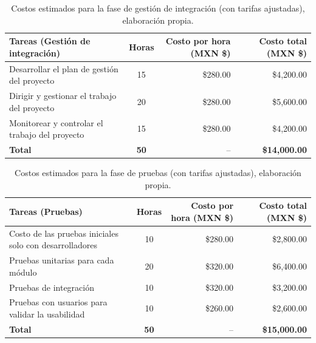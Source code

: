 \begin{table}[H]
	\centering
	\renewcommand{\arraystretch}{1.6}
	\setlength{\tabcolsep}{10pt}
	\Huge
	\begin{adjustbox}{max width=\textwidth}
		\begin{tabular}{|p{9.5cm}|c|r|r|}
			\hline
			\textbf{Tareas (Gestión de integración)} & \textbf{Horas} & \textbf{Costo por hora (MXN \$)} & \textbf{Costo total (MXN \$)} \\ \hline
			Desarrollar el plan de gestión del proyecto & 15 & \$280.00 & \$4,200.00 \\ \hline
			Dirigir y gestionar el trabajo del proyecto & 20 & \$280.00 & \$5,600.00 \\ \hline
			Monitorear y controlar el trabajo del proyecto & 15 & \$280.00 & \$4,200.00 \\ \hline
			\textbf{Total} & \textbf{50} & -- & \textbf{\$14,000.00} \\ \hline
		\end{tabular}
	\end{adjustbox}
	\caption[Costos estimados para la fase de gestión de integración (con tarifas ajustadas)]{Costos estimados para la fase de gestión de integración (con tarifas ajustadas), elaboración propia.} 
	\label{tab:costos_integracion_actualizado}
\end{table}

\begin{table}[H]
	\centering
	\renewcommand{\arraystretch}{1.6}
	\setlength{\tabcolsep}{10pt}
	\Huge
	\begin{adjustbox}{max width=\textwidth}
		\begin{tabular}{|p{9.5cm}|c|r|r|}
			\hline
			\textbf{Tareas (Pruebas)} & \textbf{Horas} & \textbf{Costo por hora (MXN \$)} & \textbf{Costo total (MXN \$)} \\ \hline
			Costo de las pruebas iniciales solo con desarrolladores & 10 & \$280.00 & \$2,800.00 \\ \hline
			Pruebas unitarias para cada módulo & 20 & \$320.00 & \$6,400.00 \\ \hline
			Pruebas de integración & 10 & \$320.00 & \$3,200.00 \\ \hline
			Pruebas con usuarios para validar la usabilidad & 10 & \$260.00 & \$2,600.00 \\ \hline
			\textbf{Total} & \textbf{50} & -- & \textbf{\$15,000.00} \\ \hline
		\end{tabular}
	\end{adjustbox}
	\caption[Costos estimados para la fase de pruebas (con tarifas ajustadas)]{Costos estimados para la fase de pruebas (con tarifas ajustadas), elaboración propia.} 
	\label{tab:costos_pruebas_actualizado}
\end{table}

